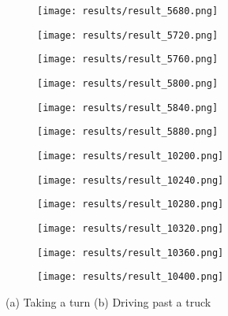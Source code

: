 \documentclass{article}
\begin{document}
\begin{figure}[H]
\centering
		\begin{subfigure}[b]{0.15\textwidth}
		\centering
		\texttt{[image: results/result\_5680.png]}
	\end{subfigure}
	\begin{subfigure}[b]{0.15\textwidth}
		\centering
		\texttt{[image: results/result\_5720.png]}
	\end{subfigure}
	\begin{subfigure}[b]{0.15\textwidth}
		\centering
		\texttt{[image: results/result\_5760.png]}
	\end{subfigure}
	\begin{subfigure}[b]{0.15\textwidth}
		\centering
		\texttt{[image: results/result\_5800.png]}
	\end{subfigure}
	\begin{subfigure}[b]{0.15\textwidth}
		\centering
		\texttt{[image: results/result\_5840.png]}
	\end{subfigure}
	\begin{subfigure}[b]{0.15\textwidth}
		\centering
		\texttt{[image: results/result\_5880.png]}
	\end{subfigure}
	\begin{subfigure}[b]{0.15\textwidth}
		\centering
		\texttt{[image: results/result\_10200.png]}
	\end{subfigure}
	\begin{subfigure}[b]{0.15\textwidth}
		\centering
		\texttt{[image: results/result\_10240.png]}
	\end{subfigure}
	\begin{subfigure}[b]{0.15\textwidth}
		\centering
		\texttt{[image: results/result\_10280.png]}
	\end{subfigure}
	\begin{subfigure}[b]{0.15\textwidth}
		\centering
		\texttt{[image: results/result\_10320.png]}
	\end{subfigure}
	\begin{subfigure}[b]{0.15\textwidth}
		\centering
		\texttt{[image: results/result\_10360.png]}
	\end{subfigure}
	\begin{subfigure}[b]{0.15\textwidth}
		\centering
		\texttt{[image: results/result\_10400.png]}
	\end{subfigure}
	\caption{(a) Taking a turn (b) Driving past a truck}
\end{figure}
\end{document}
